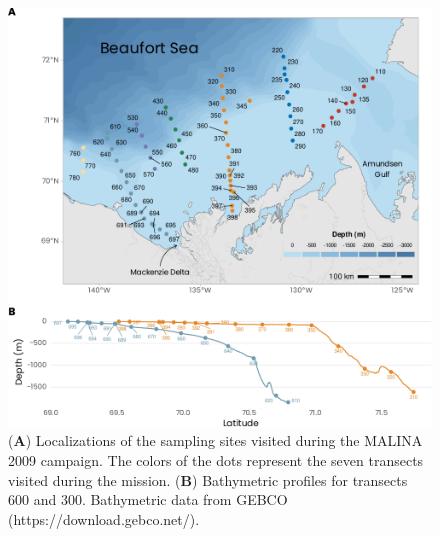 \documentclass[essd, manuscript]{copernicus}
\begin{document}
\begin{figure}[H]
	\centering
	\includegraphics[scale = 1]{../../../graphs/fig01.pdf}
	\caption{(\textbf{A}) Localizations of the sampling sites visited during the MALINA 2009 campaign. The colors of the dots represent the seven transects visited during the mission. (\textbf{B}) Bathymetric profiles for transects 600 and 300. Bathymetric data from GEBCO (https://download.gebco.net/).}
\end{figure}

\clearpage
\end{document}
